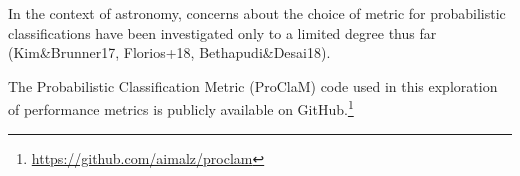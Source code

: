 In the context of astronomy, concerns about the choice of metric for probabilistic classifications have been investigated only to a limited degree thus far (Kim\&Brunner17, Florios+18, Bethapudi\&Desai18).

The Probabilistic Classification Metric (ProClaM) code used in this exploration of performance metrics is publicly available on GitHub.\footnote{\url{https://github.com/aimalz/proclam}}
